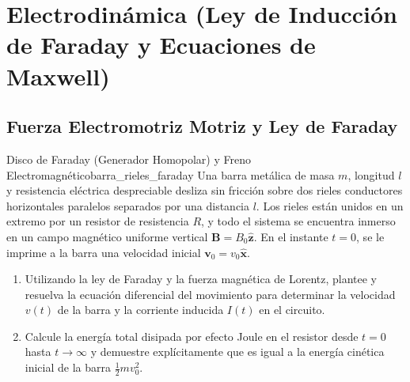 \documentclass[11pt,a4paper]{book}
\newcommand{\xhat}{\hat{\bm{x}}}
\newcommand{\zhat}{\hat{\bm{z}}}
\newcommand{\Bvec}{\bm{B}}
\begin{document}
\chapter[Electrodinámica]{Electrodinámica (Ley de Inducción de Faraday y Ecuaciones de Maxwell)}

\section{Fuerza Electromotriz Motriz y Ley de Faraday}

\begin{ejercicio}{Disco de Faraday (Generador Homopolar) y Freno Electromagnético}{barra_rieles_faraday}
Una barra metálica de masa $m$, longitud $l$ y resistencia eléctrica despreciable desliza sin fricción sobre dos rieles conductores horizontales paralelos separados por una distancia $l$. Los rieles están unidos en un extremo por un resistor de resistencia $R$, y todo el sistema se encuentra inmerso en un campo magnético uniforme vertical $\Bvec = B_0 \zhat$. En el instante $t = 0$, se le imprime a la barra una velocidad inicial $\bm{v}_0 = v_0 \xhat$.
\begin{enumerate}[label=\alph*)]
    \item Utilizando la ley de Faraday y la fuerza magnética de Lorentz, plantee y resuelva la ecuación diferencial del movimiento para determinar la velocidad $v(t)$ de la barra y la corriente inducida $I(t)$ en el circuito.
    \item Calcule la energía total disipada por efecto Joule en el resistor desde $t = 0$ hasta $t \to \infty$ y demuestre explícitamente que es igual a la energía cinética inicial de la barra $\frac{1}{2}mv_0^2$.
\end{enumerate}
\end{ejercicio}
\end{document}
